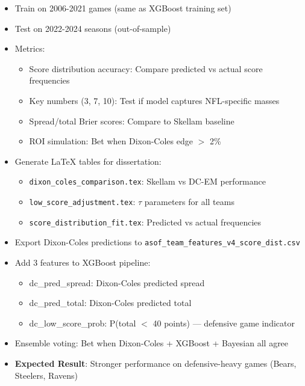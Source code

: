 \begin{itemize}
  \item {} Train on 2006-2021 games (same as XGBoost training set)
  \item {} Test on 2022-2024 seasons (out-of-sample)
  \item {} Metrics:
  \begin{itemize}
    \item Score distribution accuracy: Compare predicted vs actual score frequencies
    \item Key numbers (3, 7, 10): Test if model captures NFL-specific masses
    \item Spread/total Brier scores: Compare to Skellam baseline
    \item ROI simulation: Bet when Dixon-Coles edge $>$ 2\%
  \end{itemize}
  \item {} Generate LaTeX tables for dissertation:
  \begin{itemize}
    \item \texttt{dixon\_coles\_comparison.tex}: Skellam vs DC-EM performance
    \item \texttt{low\_score\_adjustment.tex}: $\tau$ parameters for all teams
    \item \texttt{score\_distribution\_fit.tex}: Predicted vs actual frequencies
  \end{itemize}
\end{itemize}

\begin{itemize}
  \item {} Export Dixon-Coles predictions to \texttt{asof\_team\_features\_v4\_score\_dist.csv}
  \item {} Add 3 features to XGBoost pipeline:
  \begin{itemize}
    \item dc\_pred\_spread: Dixon-Coles predicted spread
    \item dc\_pred\_total: Dixon-Coles predicted total
    \item dc\_low\_score\_prob: P(total $<$ 40 points) — defensive game indicator
  \end{itemize}
  \item {} Ensemble voting: Bet when Dixon-Coles + XGBoost + Bayesian all agree
  \item \textbf{Expected Result}: Stronger performance on defensive-heavy games (Bears, Steelers, Ravens)
\end{itemize}

